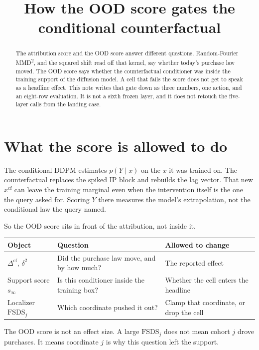 \documentclass[11pt]{article}
\title{How the OOD score gates the conditional counterfactual}
\author{}
\date{}
\begin{document}
\maketitle

\begin{abstract}
The attribution score and the OOD score answer different questions.
Random-Fourier MMD\textsuperscript{2}, and the squared shift read off that kernel, say whether today's purchase law moved.
The OOD score says whether the counterfactual conditioner was inside the training support of the diffusion model.
A cell that fails the score does not get to speak as a headline effect.
This note writes that gate down as three numbers, one action, and an eight-row evaluation.
It is not a sixth frozen layer, and it does not retouch the five-layer calls from the landing case.
\end{abstract}

\section{What the score is allowed to do}

The conditional DDPM estimates $p(Y\mid x)$ on the $x$ it was trained on.
The counterfactual replaces the spiked IP block and rebuilds the lag vector.
That new $x^{\mathrm{cf}}$ can leave the training marginal even when the intervention itself is the one the query asked for.
Scoring $Y$ there measures the model's extrapolation, not the conditional law the query named.

So the OOD score sits in front of the attribution, not inside it.

\begin{center}
\begin{tabular}{@{}llp{7.2cm}@{}}
\toprule
Object & Question & Allowed to change \\
\midrule
$\Delta^{\mathrm{cf}}$, $\delta^{2}$ & Did the purchase law move, and by how much? & The reported effect \\
Support score $s_{\infty}$ & Is this conditioner inside the training box? & Whether the cell enters the headline \\
Localizer $\mathrm{FSDS}_{j}$ & Which coordinate pushed it out? & Clamp that coordinate, or drop the cell \\
\bottomrule
\end{tabular}
\end{center}

The OOD score is not an effect size.
A large $\mathrm{FSDS}_{j}$ does not mean cohort $j$ drove purchases.
It means coordinate $j$ is why this question left the support.
\end{document}
